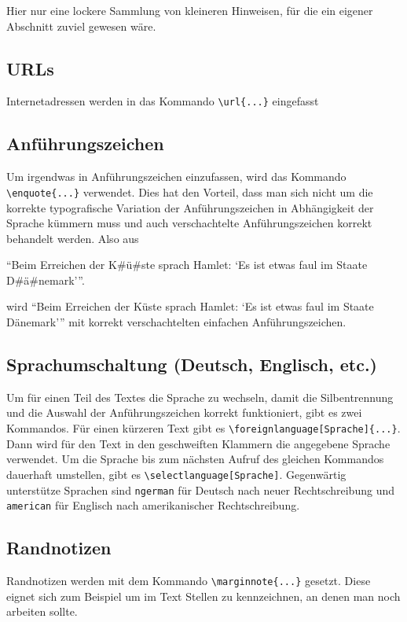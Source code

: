 Hier nur eine lockere Sammlung von kleineren Hinweisen, für die ein eigener
Abschnitt zuviel gewesen wäre.

\subsection{URLs}

Internetadressen werden in das Kommando \verb#\url{...}# eingefasst

\subsection{Anführungszeichen}

Um irgendwas in Anführungszeichen einzufassen, wird das Kommando 
\verb#\enquote{...}# verwendet. Dies hat den Vorteil, dass man sich nicht um die
korrekte typografische Variation der Anführungszeichen in Abhängigkeit der
Sprache kümmern muss und auch verschachtelte Anführungszeichen korrekt behandelt
werden. Also aus
\begin{latex}[caption={Behandlung von Anführungszeichen},label={lst:quotes},escapechar=\#]
 \enquote{Beim Erreichen der K#ü#ste sprach Hamlet: \enquote{Es ist etwas faul im Staate D#ä#nemark}}.
\end{latex}
wird \enquote{Beim Erreichen der Küste sprach Hamlet: \enquote{Es ist etwas faul
im Staate Dänemark}} mit korrekt verschachtelten einfachen Anführungszeichen.

\subsection{Sprachumschaltung (Deutsch, Englisch, etc.)}

Um für einen Teil des Textes die Sprache zu wechseln, damit die
Silbentrennung und die Auswahl der Anführungszeichen
korrekt funktioniert, gibt es zwei Kommandos. Für einen kürzeren Text gibt es
\verb#\foreignlanguage[Sprache]{...}#. Dann wird für den Text in den
geschweiften Klammern die angegebene Sprache verwendet. Um die Sprache bis zum
nächsten Aufruf des gleichen Kommandos dauerhaft umstellen, gibt es
\verb#\selectlanguage[Sprache]#. Gegenwärtig unterstütze Sprachen sind
\texttt{ngerman} für Deutsch nach neuer
Rechtschreibung und \texttt{american} für
Englisch nach amerikanischer Rechtschreibung.

\subsection{Randnotizen}

Randnotizen werden mit dem Kommando \verb#\marginnote{...}# gesetzt.
Diese eignet sich zum Beispiel um im Text Stellen zu kennzeichnen, an denen
man noch arbeiten sollte.